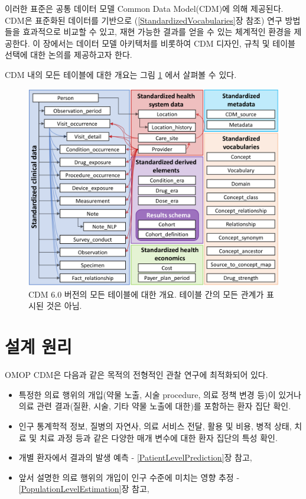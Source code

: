 \documentclass[10.5pt]{book}
\providecommand{\tightlist}{%
  \setlength{\itemsep}{0pt}\setlength{\parskip}{0pt}}
\theoremstyle{definition}
\theoremstyle{definition}
\theoremstyle{definition}
\theoremstyle{remark}
\begin{document}
이러한 표준은 공통 데이터 모델 Common Data Model(CDM)에 의해 제공된다.
CDM은 표준화된 데이터를 기반으로 (\ref{StandardizedVocabularies}장 참조)
연구 방법들을 효과적으로 비교할 수 있고, 재현 가능한 결과를 얻을 수 있는
체계적인 환경을 제공한다. 이 장에서는 데이터 모델 아키텍처를 비롯하여
CDM 디자인, 규칙 및 테이블 선택에 대한 논의를 제공하고자 한다.

CDM 내의 모든 테이블에 대한 개요는 그림 \ref{fig:cdmDiagram}
에서 살펴볼 수 있다.

\begin{figure}
\includegraphics[width=1\linewidth]{images/CommonDataModel/cdmDiagram} \caption{CDM 6.0 버전의 모든 테이블에 대한 개요. 테이블 간의 모든 관계가 표시된 것은 아님.}\label{fig:cdmDiagram}
\end{figure}

\section{설계 원리}\label{-}

OMOP CDM은 다음과 같은 목적의 전형적인 관찰 연구에 최적화되어
있다.

\begin{itemize}
\tightlist
\item
  특정한 의료 행위의 개입(약물 노출, 시술 procedure, 의료 정책 변경
  등)이 있거나 의료 관련 결과(질환, 시술, 기타 약물 노출에 대한)를
  포함하는 환자 집단 확인.
\item
  인구 통계학적 정보, 질병의 자연사, 의료 서비스 전달, 활용 및 비용,
  병적 상태, 치료 및 치료 과정 등과 같은 다양한 매개 변수에 대한 환자
  집단의 특성 확인.
\item
  개별 환자에서 결과의 발생 예측 - \ref{PatientLevelPrediction}장 참고,
\item
  앞서 설명한 의료 행위의 개입이 인구 수준에 미치는 영향 추정 -
  \ref{PopulationLevelEstimation}장 참고,
\end{itemize}
\end{document}
